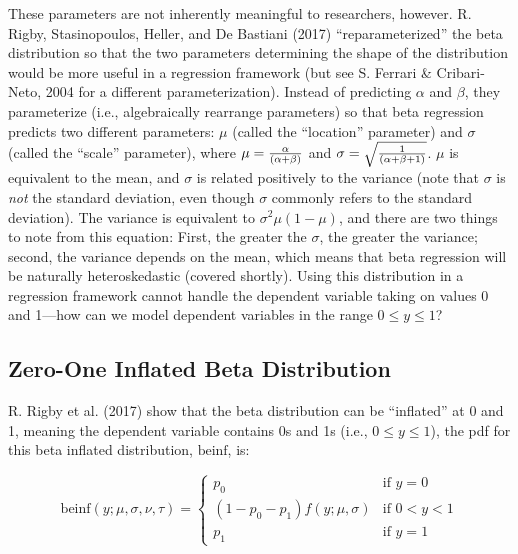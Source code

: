 \documentclass[english,man]{apa6}
\theoremstyle{definition}
\theoremstyle{definition}
\theoremstyle{remark}
\begin{document}
These parameters are not inherently meaningful to researchers, however.
R. Rigby, Stasinopoulos, Heller, and De Bastiani (2017)
\enquote{reparameterized} the beta distribution so that the two
parameters determining the shape of the distribution would be more
useful in a regression framework (but see S. Ferrari \& Cribari-Neto,
2004 for a different parameterization). Instead of predicting \(\alpha\)
and \(\beta\), they parameterize (i.e., algebraically rearrange
parameters) so that beta regression predicts two different parameters:
\(\mu\) (called the \enquote{location} parameter) and \(\sigma\) (called
the \enquote{scale} parameter), where
\(\mu={\alpha\over(\alpha+\beta)}\) and
\(\sigma=\sqrt{1\over(\alpha+\beta+1)}\). \(\mu\) is equivalent to the
mean, and \(\sigma\) is related positively to the variance (note that
\(\sigma\) is \emph{not} the standard deviation, even though \(\sigma\)
commonly refers to the standard deviation). The variance is equivalent
to \(\sigma^2\mu(1-\mu)\), and there are two things to note from this
equation: First, the greater the \(\sigma\), the greater the variance;
second, the variance depends on the mean, which means that beta
regression will be naturally heteroskedastic (covered shortly). Using
this distribution in a regression framework cannot handle the dependent
variable taking on values 0 and 1---how can we model dependent variables
in the range \(0 \leq y \leq 1\)?

\subsection{Zero-One Inflated Beta
Distribution}\label{zero-one-inflated-beta-distribution}

R. Rigby et al. (2017) show that the beta distribution can be
\enquote{inflated} at 0 and 1, meaning the dependent variable contains
0s and 1s (i.e., \(0 \leq y \leq 1\)), the pdf for this beta inflated
distribution, \(\text{beinf}\), is:

\begin{center}
\[
\text{beinf}(y;\mu,\sigma,\nu,\tau) =
\begin{cases}
  p_0                             & \text{if } y = 0\\
  (1 - p_0 - p_1)f(y;\mu,\sigma)  & \text{if } 0 < y < 1\\
  p_1                             & \text{if } y = 1
\end{cases}
\]
\end{center}
\end{document}
